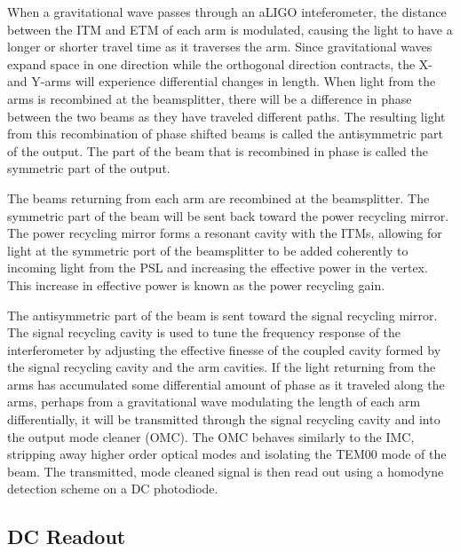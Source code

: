 When a gravitational wave passes through an aLIGO inteferometer, the distance
between the ITM and ETM of each arm is modulated, causing the light to have a
longer or shorter travel time as it traverses the arm. Since gravitational
waves expand space in one direction while the orthogonal direction contracts,     
the X- and Y-arms will experience differential changes in length. When light
from the arms is recombined at the beamsplitter, there will be a difference
in phase between the two beams as they have traveled different paths. The 
resulting light from this recombination of phase shifted beams is called the 
antisymmetric part of the output. The part of the beam that is recombined 
in phase is called the symmetric part of the output.

The beams returning from each arm are recombined at the beamsplitter. The 
symmetric part of the beam 
will be sent back toward the power recycling mirror. The power recycling mirror 
forms a resonant cavity with the ITMs, allowing for light at the symmetric 
port of the beamsplitter to be added coherently to incoming light from the PSL and 
increasing the effective power in the vertex. This increase in effective power 
is known as the power recycling gain. 

The antisymmetric part of the beam is sent toward the signal recycling mirror. 
The signal recycling cavity is used to tune the frequency response of the 
interferometer by adjusting the effective finesse of the coupled cavity 
formed by the signal recycling cavity and the arm cavities. 
If the light returning from the arms has accumulated some differential amount of 
phase as it traveled 
along the arms, perhaps from a gravitational wave modulating the length of each 
arm differentially, it will be transmitted through the signal recycling cavity 
and into the output mode cleaner (OMC). The OMC behaves similarly to the IMC, 
stripping away higher order optical modes and isolating the TEM00 mode of the 
beam. The transmitted, mode cleaned signal is then read out using a homodyne 
detection scheme on a DC photodiode.

\subsection{DC Readout}

